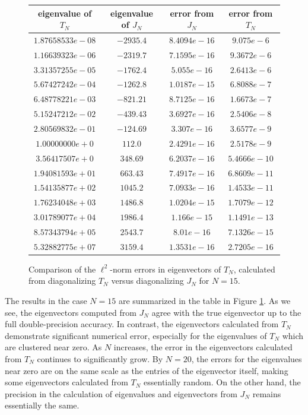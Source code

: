 \documentclass[11pt]{amsart}
\theoremstyle{plain}
\theoremstyle{named}
\begin{document}
\begin{figure}[htp]
\begin{tabular}{c|c|c|c}
eigenvalue of $T_N$ & eigenvalue of $J_N$ & error from $J_N$ & error from $T_N$\\\hline
$1.87658533e-08$ & $-2935.4$& $8.4094e-16$& $9.075e-6$\\
$ 1.16639323e-06$ & $-2319.7$& $7.1595e-16$& $9.3672e-6$\\
$3.31357255e-05$ & $-1762.4$& $5.055e-16$& $2.6413e-6$\\
$5.67427242e-04$ & $-1262.8$& $1.0187e-15$& $6.8088e-7$\\
$6.48778221e-03$ & $-821.21$& $8.7125e-16$& $1.6673e-7$\\
$5.15247212e-02$ & $-439.43$& $3.6927e-16$& $2.5406e-8$\\
$2.80569832e-01$ & $-124.69$& $3.307e-16$& $3.6577e-9$\\
$1.00000000e+0$ & $112.0$& $2.4291e-16$& $2.5178e-9$\\
$3.56417507e+0$ & $348.69$& $6.2037e-16$& $5.4666e-10$\\
$1.94081593e+01$ & $663.43$& $7.4917e-16$& $6.8609e-11$\\
$1.54135877e+02$ & $1045.2$& $7.0933e-16$& $1.4533e-11$\\
$1.76234048e+03$ & $1486.8$& $1.0204e-15$& $1.7079e-12$\\
$3.01789077e+04$ & $1986.4$& $1.166e-15$& $1.1491e-13$\\
$8.57343794e+05$ & $2543.7$& $8.01e-16$& $7.1326e-15$\\
$5.32882775e+07$ & $3159.4$& $1.3531e-16$& $2.7205e-16$
\end{tabular}
\caption{Comparison of the $\ell^2$-norm errors in eigenvectors of $T_N$, calculated from diagonalizing $T_N$ versus diagonalizing $J_N$ for $N=15$.}
\label{fig:eigenerror}
\end{figure}

The results in the case $N=15$ are summarized in the table in Figure \ref{fig:eigenerror}.
As we see, the eigenvectors computed from $J_N$ agree with the true eigenvector up to the full double-precision accuracy.
In contrast, the eigenvectors calculated from $T_N$ demonstrate significant numerical error, especially for the eigenvalues of $T_N$ which are clustered near zero.
As $N$ increases, the error in the eigenvectors calculated from $T_N$ continues to significantly grow.
By $N=20$, the errors for the eigenvalues near zero are on the same scale as the entries of the eigenvector itself, making some eigenvectors calculated from $T_N$ essentially random.
On the other hand, the precision in the calculation of eigenvalues and eigenvectors from $J_N$ remains essentially the same.
\end{document}
